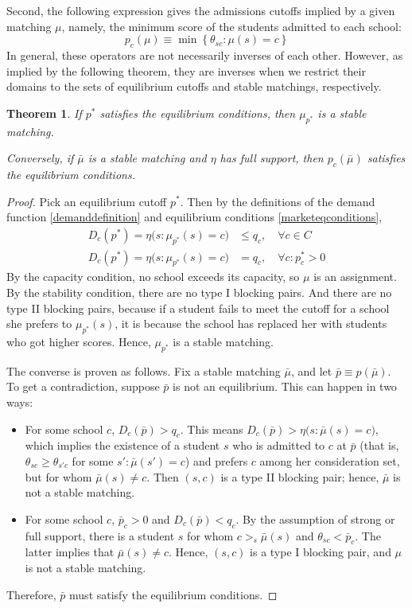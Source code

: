 \documentclass[12pt]{article}
\newtheorem{theorem}{Theorem}
\theoremstyle{definition}
\begin{document}
Second, the following expression gives the admissions cutoffs implied by a given matching $\mu$, namely, the minimum score of the students admitted to each school:
\[p_c(\mu) \equiv \min \left\{\theta_{sc}: \mu(s) = c\right\}\]
In general, these operators are not necessarily inverses of each other. However, as implied by the following theorem, they are inverses when we restrict their domains to the sets of equilibrium cutoffs and stable matchings, respectively. 

\begin{theorem}If $p^*$ satisfies the equilibrium conditions, then $\mu_{p^*}$ is a stable matching. 

Conversely, if $\bar \mu$ is a stable matching and $\eta$ has full support, then $p_c(\bar \mu)$ satisfies the equilibrium conditions. \end{theorem}

\begin{proof}Pick an equilibrium cutoff $p^*$. Then by the definitions of the demand function \eqref{demanddefinition} and equilibrium conditions \eqref{marketeqconditions}, 
\begin{align*}
D_c(p^*) = \eta\bigl(s: \mu_{p^*}(s) = c\bigr) &\leq q_c, \quad\forall c \in C \\
D_c(p^*) = \eta\bigl(s: \mu_{p^*}(s) = c\bigr) &= q_c, \quad \forall c: p_c^* > 0 
\end{align*}
By the capacity condition, no school exceeds its capacity, so $\mu$ is an assignment. By the stability condition, there are no type I blocking pairs. And there are no type II blocking pairs, because if a student fails to meet the cutoff for a school she prefers to $\mu_{p^*}(s)$, it is because the school has replaced her with students who got higher scores. Hence, $\mu_{p^*}$ is a stable matching.

The converse is proven as follows. Fix a stable matching $\bar \mu$, and let $\bar p \equiv p(\bar \mu)$. To get a contradiction, suppose $\bar p$ is not an equilibrium. This can happen in two ways:
\begin{itemize}
\item For some school $c$, $D_c( \bar p) > q_c$. This means $D_c( \bar p)  >  \eta\bigl(s: \bar \mu(s) = c\bigr) $, which implies the existence of a student $s$ who is admitted to $c$ at $\bar p$ (that is, $\theta_{sc} \geq \theta_{s'c}$ for some $s': \bar \mu(s') = c$) and prefers $c$ among her consideration set, but for whom $\bar \mu(s) \neq c$. Then $(s, c)$ is a type II blocking pair; hence, $\bar \mu$ is not a stable matching.
\item For some school $c$, $\bar p_c > 0$ and $D_c(\bar p) < q_c$. By the assumption of strong or full support, there is a student $s$ for whom $c >_s \bar \mu(s)$ and $\theta_{sc} < \bar p_c$. The latter implies that $\bar \mu(s) \neq c$. Hence, $(s, c)$ is a type I blocking pair, and $\mu$ is not a stable matching. 
\end{itemize}
Therefore, $\bar p$ must satisfy the equilibrium conditions.
\end{proof}
\end{document}
